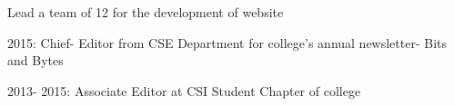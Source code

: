 \documentclass[]{resume-openfont}
\begin{document}
\begin{minipage}[t]{0.68\textwidth}
Lead a team of 12 for the development of website 
\sectionsep

\begin{tightemize}
\item 2015: Chief- Editor from CSE Department for college’s annual newsletter- Bits and Bytes
\item 2013- 2015: Associate Editor at CSI Student Chapter of college 
\end{tightemize}
\sectionsep



\end{minipage} 
\end{document}
